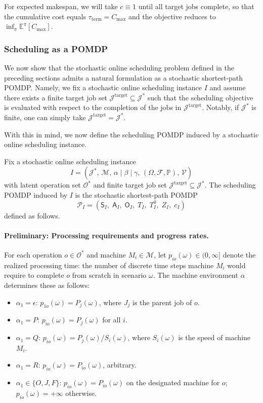 For expected makespan, we will take $c \equiv 1$ until all target jobs complete, so that the cumulative cost equals $\tau_{\mathrm{term}} = C_{\max}$ and the objective reduces to $\inf_\pi \mathbb{E}^\pi[C_{\max}]$.

\subsubsection{Scheduling as a POMDP}

We now show that the stochastic online scheduling problem defined in the preceding sections admits a natural formulation as a stochastic shortest-path POMDP. Namely, we fix a stochastic online scheduling instance $I$ and assume there exists a finite target job set $\mathcal{J}^{\mathrm{target}} \subseteq \mathcal{J}^*$ such that the scheduling
objective is evaluated with respect to the completion of the jobs in $\mathcal{J}^{\mathrm{target}}$. Notably, if $\mathcal{J}^*$ is finite, one can simply take $\mathcal{J}^{\mathrm{target}} = \mathcal{J}^*$.

With this in mind, we now define the scheduling POMDP induced by a stochastic online scheduling instance.

\begin{definition}\label{def:schedpomdp}
Fix a stochastic online scheduling instance
\[
I = (\mathcal{J}^*,\, \mathcal{M},\, \alpha \mid \beta \mid \gamma,\,
(\Omega, \mathcal{F}, \mathbb{P}),\, \mathcal{V})
\]
with latent operation set $\mathcal{O}^*$ and finite target job set
$\mathcal{J}^{\mathrm{target}} \subseteq \mathcal{J}^*$. The scheduling
POMDP induced by $I$ is the stochastic shortest-path POMDP
\[
\mathcal{P}_I = (\mathsf{S}_I,\; \mathsf{A}_I,\; \mathsf{O}_I,\; T_I,\; T_I^0,\;
Z_I,\; c_I)
\]
defined as follows.
\end{definition}

\paragraph{Preliminary: Processing requirements and progress rates.}

For each operation $o \in \mathcal{O}^*$ and machine $M_i \in \mathcal{M}$, let $p_{io}(\omega) \in (0, \infty]$ denote the realized processing time: the number of discrete time steps machine $M_i$ would require to complete $o$ from scratch in scenario $\omega$. The machine environment $\alpha$ determines these as follows:
\begin{itemize}
    \item $\alpha_1 = \epsilon$: $p_{1o}(\omega) = P_j(\omega)$, where $J_j$ is the parent
    job of $o$.
    \item $\alpha_1 = P$: $p_{io}(\omega) = P_j(\omega)$ for all $i$.
    \item $\alpha_1 = Q$: $p_{io}(\omega) = P_j(\omega) / S_i(\omega)$, where
    $S_i(\omega)$ is the speed of machine $M_i$.
    \item $\alpha_1 = R$: $p_{io}(\omega) = P_{io}(\omega)$, arbitrary.
    \item $\alpha_1 \in \{O, J, F\}$: $p_{io}(\omega) = P_{io}(\omega)$ on the designated
    machine for $o$; $p_{io}(\omega) = +\infty$ otherwise.
\end{itemize}

